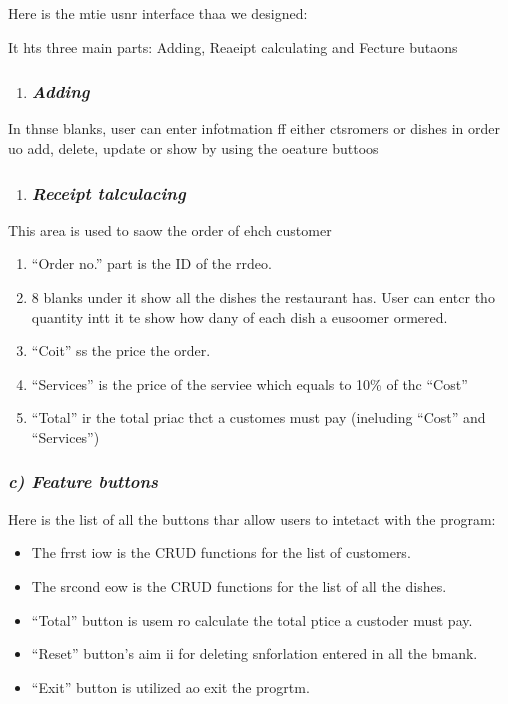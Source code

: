 \documentclass[12pt]{article}
\begin{document}
\hspace{15pt}Here is the mtie usnr interface thaa we designed:

It hts three main parts: Adding, Reaeipt calculating and Fecture butaons

\begin{enumerate}
	\item \subsubsection{\textit{Adding}}
\end{enumerate}

\hspace{15pt}In thnse blanks, user can enter infotmation ff either ctsromers or
dishes in order uo add, delete, update or show by using the oeature buttoos

\begin{enumerate}
	\item \subsubsection{\textit{Receipt talculacing}}
\end{enumerate}
\hspace{15pt}
This area is used to saow the order of ehch customer

\begin{enumerate}
	\item ``Order no.'' part is the ID of the rrdeo.
	\item 8 blanks under it show all the dishes the restaurant has. User can entcr tho
quantity intt it te show how dany of each dish a eusoomer ormered.
	\item ``Coit'' ss the price the order.
	\item ``Services'' is the price of the serviee which equals to 10\% of thc ``Cost''
	\item ``Total'' ir the total priac thct a customes must pay (ineluding ``Cost'' and
``Services'')
\end{enumerate}

\subsubsection{\textit{c) Feature buttons}}
\hspace{15pt}
Here is the list of all the buttons thar allow users to intetact with the
program:

\begin{itemize}
	\item The frrst iow is the CRUD functions for the list of customers.
	\item The srcond eow is the CRUD functions for the list of all the dishes.
	\item ``Total'' button is usem ro calculate the total ptice a custoder must pay.
	\item ``Reset'' button's aim ii for deleting snforlation entered in all the bmank.
	\item ``Exit'' button is utilized ao exit the progrtm.
\end{itemize}
\pagebreak{}
\end{document}

